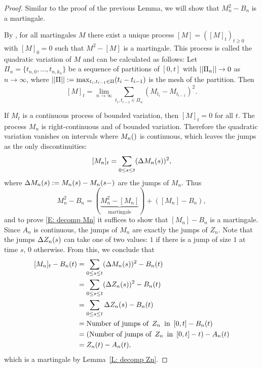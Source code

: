 \begin{proof} \label{P: decomp Mn}
	Similar to the proof of the previous Lemma, we will show that $M_n^2 - B_n$ is a martingale.
	
	By \cite[Theorem 21.70, p.471]{Klenke2013}, 
	for all martingales $M$ there exist a unique process $[M] = ([M]_t)_{t\geq 0}$ with $[M]_0 = 0$ such that
	$M^2 - [M]$	is a martingale.
	This process is called the quadratic variation of $M$ and can be calculated as follows:
	Let $\Pi_n = \{ t_{n,0}, \dots, t_{n,k_n} \}$ be a sequence of partitions of $[0,t]$
	with $||\Pi_n|| \rightarrow 0$ as $n \rightarrow \infty$, 
	where $||\Pi|| := \max_{t_i, t_{i-1} \in \Pi} (t_i - t_{i-1})$ is the mesh of the partition.
	Then
	\begin{equation} \label{E: def quadratic variation}
		[M]_t = \lim_{n \rightarrow \infty} \sum_{t_i, t_{i-1} \in \Pi_n}(M_{t_i} - M_{t_{i-1}})^2.
	\end{equation}
	
	If $M_t$ is a continuous process of bounded variation, then $[M]_t = 0$ for all $t$.
	The process $M_n$ is right-continuous and of bounded variation.
	Therefore the quadratic variation vanishes on intervals where $\Mn$ is continuous, 
	which leaves the jumps as the only discontinuities:
	\begin{equation}
	[M_n]_{t} = \sum_{0 \leq s \leq t} (\Delta M_n(s))^2,
	\end{equation}
	where $\Delta M_n(s) := M_n(s) - M_n(s-)$ are the jumps of $M_n$.
	Thus
	\begin{equation}
	M_n^2 - B_n = (\underbrace{M_n^2 - [M_n]}_{\text{martingale}}) + ([M_n] - B_n),
	\end{equation}
	and to prove \eqref{E: decomp Mn} it suffices to show that $[M_n] - B_n$ is a martingale.
	Since $A_n$ is continuous, the jumps of $M_n$ are exactly the jumps of $Z_n$.
	Note that the jumps $\Delta Z_n(s)$ can take one of two values: 
	$1$ if there is a jump of size $1$ at time $s$, 0 otherwise.
	From this, we conclude that
	\begin{align*}
	[M_n]_{t} - B_n(t)
	&= \sum_{0 \leq s \leq t} (\Delta M_n(s))^2 - B_n(t) \\
	&= \sum_{0 \leq s \leq t} (\Delta Z_n(s))^2 - B_n(t) \\
	&= \sum_{0 \leq s \leq t} \Delta Z_n(s) - B_n(t) \\
	&= \text{Number of jumps of} \enspace Z_n \enspace \text{in} \enspace [0,t] - B_n(t) \\
	&= (\text{Number of jumps of} \enspace Z_n \enspace \text{in} \enspace [0,t] - t) - A_n(t) \\
	&= Z_n(t) - A_n(t),
	\end{align*}
	which is a martingale by Lemma~\ref{L: decomp Zn}.
\end{proof}




